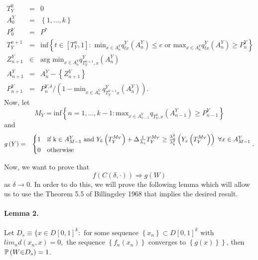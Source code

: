 \documentclass[11pt,english]{article}
\begin{document}
\begin{eqnarray*}
T_{Y}^{0} & = & 0\\
A_{0}^{Y} & = & \left\{ 1,\ldots,k\right\} \\
P_{0}^{Y} & = & P^{*}\\
T_{Y}^{n+1} & = & \mbox{inf}\left\{ t\in\left[T_{Y}^{n},1\right]:\mbox{ min}_{x\in A_{n}^{Y}}q_{tx}^{Y}\left(A_{n}^{Y}\right)\leq c\mbox{ or }\mbox{max}_{x\in A_{n}^{Y}}q_{tx}^{Y}\left(A_{n}^{Y}\right)\geq P_{n}^{Y}\right\} \\
Z_{n+1}^{Y} & \in & \mbox{arg min}_{x\in A_{n}^{Y}}q_{T_{Y}^{n+1},x}^{Y}\left(A_{n}^{Y}\right)\\
A_{n+1}^{Y} & = & A_{n}^{Y}-\left\{ Z_{n+1}^{Y}\right\} \\
P_{n+1}^{Y} & = & P_{n}^{Y,\delta}/\left(1-\mbox{min}_{x\in A_{n}^{Y,}}q_{T_{Y}^{n+1}x}^{Y}\left(A_{n}^{Y}\right)\right).
\end{eqnarray*}
Now, let
\[
M_{Y}=\mbox{inf}\left\{ n=1,\ldots,k-1:\mbox{max}_{x\in A_{n-1}^{Y}}q_{T_{Y}^{n},x}\left(A_{n-1}^{Y}\right)\geq P_{n-1}^{Y}\right\} 
\]
and
\[
\]
\begin{eqnarray*}
g\left(Y\right) & = & \begin{cases}
1 & \mbox{if }\mbox{k}\in A_{M-1}^{Y}\mbox{ and }Y_{k}\left(T_{Y}^{M_{Y}}\right)+\Delta\frac{1}{\lambda_{z}}T_{Y}^{M_{Y}}\geq\frac{\lambda_{x}^{2}}{\lambda_{k}^{2}}\left(Y_{x}\left(T_{Y}^{M_{Y}}\right)\right)\mbox{ }\mbox{\ensuremath{\forall}}x\in A_{M-1}^{Y}\\
0 & \mbox{otherwise}
\end{cases}.
\end{eqnarray*}


Now, we want to prove that 
\[
f\left(C\left(\delta,\cdot\right)\right)\Rightarrow g\left(W\right)
\]
as $\delta\rightarrow0$. In order to do this, we will prove the following
lemma which will allow us to use the Theorem 5.5 of Billingsley 1968
that implies the desired result.


\paragraph*{Lemma 2.}

Let $D_{s}\equiv\{x\in D\left[0,1\right]^{k}:\mbox{ for some sequence }\left\{ x_{n}\right\} \subset D\left[0,1\right]^{k}\mbox{ with }$
$lim_{n}d\left(x_{n},x\right)=0,$ the sequence $\left\{ f_{n}\left(x_{n}\right)\right\} $
converges to $\left\{ g\left(x\right)\right\} $$\left.\right\} $$ $,
then $ $$\mathbb{P}\left(W\text{\ensuremath{\in}}D_{s}\right)=1$.
\end{document}

